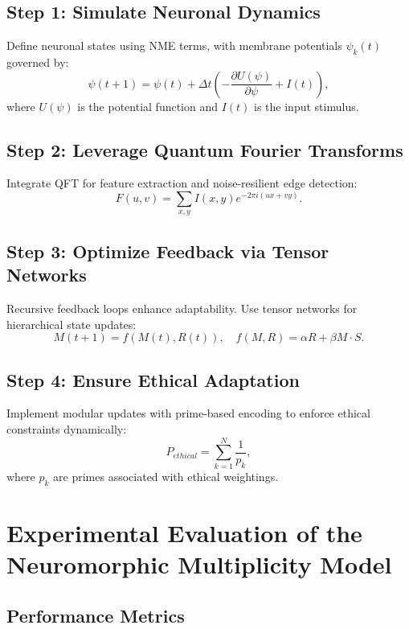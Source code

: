 \documentclass{article}
\theoremstyle{plain}
\begin{document}
\begin{itemize}
\begin{itemize}
\subsection{Step 1: Simulate Neuronal Dynamics}
Define neuronal states using NME terms, with membrane potentials $\psi_k(t)$ governed by:
\begin{equation}
\psi(t+1) = \psi(t) + \Delta t \left(-\frac{\partial U(\psi)}{\partial \psi} + I(t)\right),
\end{equation}
where $U(\psi)$ is the potential function and $I(t)$ is the input stimulus.

\subsection{Step 2: Leverage Quantum Fourier Transforms}
Integrate QFT for feature extraction and noise-resilient edge detection:
\begin{equation}
F(u, v) = \sum_{x, y} I(x, y)e^{-2\pi i (ux + vy)}.
\end{equation}

\subsection{Step 3: Optimize Feedback via Tensor Networks}
Recursive feedback loops enhance adaptability. Use tensor networks for hierarchical state updates:
\begin{equation}
M(t+1) = f(M(t), R(t)), \quad f(M, R) = \alpha R + \beta M \cdot S.
\end{equation}

\subsection{Step 4: Ensure Ethical Adaptation}
Implement modular updates with prime-based encoding to enforce ethical constraints dynamically:
\begin{equation}
P_{ethical} = \sum_{k=1}^N \frac{1}{p_k},
\end{equation}
where $p_k$ are primes associated with ethical weightings.

\section{Experimental Evaluation of the Neuromorphic Multiplicity Model}

\subsection{Performance Metrics}


\end{itemize}
\end{itemize}
\end{document}
